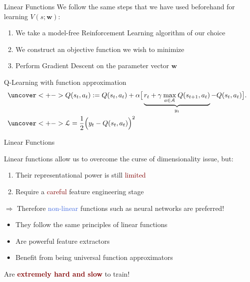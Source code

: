 \documentclass{beamer}
\begin{document}
\begin{frame}{Linear Functions}
	We follow the same steps that we have used beforehand for learning $V(s;\mathbf{w})$:
	\begin{enumerate}
		\item We take a model-free Reinforcement Learning algorithm of our choice
		\item We construct an objective function we wish to minimize 
		\item Perform Gradient Descent on the parameter vector $\mathbf{w}$
	\end{enumerate}


	\begin{block}{Q-Learning with function approximation}	
		\begin{align*}
			& \uncover<+-> {Q(s_t,a_t):=Q(s_t,a_t) + \alpha\big[\underbrace{r_t + \gamma \:\underset{a\in \mathcal{A}}{\max}\:Q(s_{t+1},a_t)}_{y_t} - Q(s_t, a_t) \big].} \\
				& \uncover<+-> {\mathcal{L} = \frac{1}{2}\Big(y_t - Q(s_t, a_t)\Big)^2} \\
		\end{align*}

	\end{block}
	
\end{frame}

\begin{frame}{Linear Functions}

	Linear functions allow us to overcome the curse of dimensionality issue, but:
	\begin{enumerate}
		\item Their representational power is still \textcolor{Maroon}{limited}
		\item Require a \textcolor{Maroon}{careful} feature engineering stage
	\end{enumerate}

	\bigskip

	$\Rightarrow$ Therefore \textcolor{RoyalBlue}{non-linear} functions such as neural networks are preferred!
	\begin{itemize}
		\item They follow the same principles of linear functions 
		\item Are powerful feature extractors 
		\item Benefit from being universal function approximators
	\end{itemize}

	\bigskip

	\begin{center}
		Are \textcolor{Maroon}{\textbf{extremely hard and slow}} to train!
	\end{center}

\end{frame}
\end{document}
